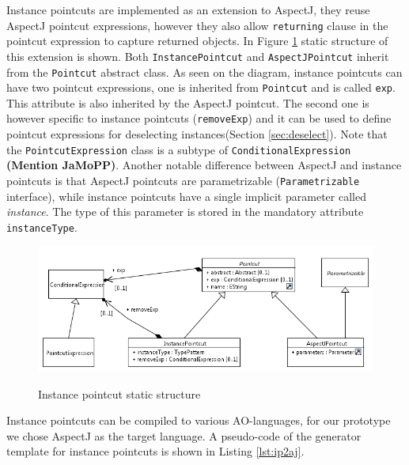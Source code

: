 \documentclass{llncs}
\begin{document}
Instance pointcuts are implemented as an extension to AspectJ, they reuse AspectJ pointcut expressions, however they also allow \texttt{returning} clause in the pointcut expression to capture returned objects. In Figure \ref{fig:ip} static structure of this extension is shown. Both \texttt{InstancePointcut} and \texttt{AspectJPointcut} inherit from the \texttt{Pointcut} abstract class. As seen on the diagram, instance pointcuts can have two pointcut expressions, one is inherited from \texttt{Pointcut} and is called \texttt{exp}. This attribute is also inherited by the AspectJ pointcut. The second one is however specific to instance pointcuts (\texttt{removeExp}) and it can be used to define pointcut expressions for deselecting instances(Section \ref{sec:deselect}). Note that the \texttt{PointcutExpression} class is a subtype of \texttt{ConditionalExpression} \textbf{\textcolor[rgb]{1,0.41,0.13}{(Mention JaMoPP)}}. Another notable difference between AspectJ and instance pointcuts is that AspectJ pointcuts are parametrizable (\texttt{Parametrizable} interface), while instance pointcuts have a single implicit parameter called \emph{instance}. The type of this parameter is stored in the mandatory attribute \texttt{instanceType}.

\begin{figure}
\centering
   \includegraphics[width=\textwidth] {images/pc.png}
   \label{fig:shapes}
\label{fig:ip}
\caption{Instance pointcut static structure}
\end{figure}

Instance pointcuts can be compiled to various AO-languages, for our prototype we chose AspectJ as the target language. A pseudo-code of the generator template for instance pointcuts is shown in Listing \ref{lst:ip2aj}. 
\end{document}
